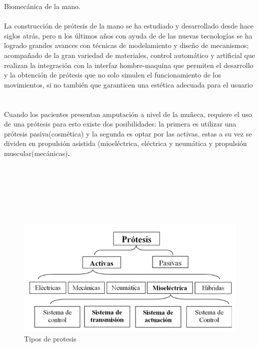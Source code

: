 \documentclass{article}
\begin{document}
{Biomecánica de la mano.} \\
\\
La construcción de prótesis de la mano se ha estudiado y desarrollado desde hace siglos atrás, pero n los últimos años con ayuda de de las nuevas tecnologías se ha logrado grandes avances con técnicas de modelamiento y diseño de mecanismos; acompañado de la gran variedad de materiales, control automático y artificial que realizan la integración con la interfaz hombre-maquina que permiten el desarrollo y la obtención de prótesis que no solo simulen el funcionamiento de los movimientos, si no también que garanticen una estética adecuada para el usuario \\
\\
\\
Cuando los pacientes presentan amputación a nivel de la muñeca, requiere el uso de una prótesis para esto existe dos posibilidades: la primera es utilizar una prótesis pasiva(cosmética) y la segunda es optar por las activas, estas a su vez se dividen en propulsión asistida (mioeléctrica, eléctrica y neumática y propulsión muscular(mecánicas)\cite{ff2}\textbf .\\
\\
\\
\\
\\
\\
\\

\begin{figure} [htp]%
    \centering
    \includegraphics[width=150mm]{biomecanica1.png} %
    \caption{Tipos de protesis}
    \label{grafica}
\end{figure}
\end{document}
